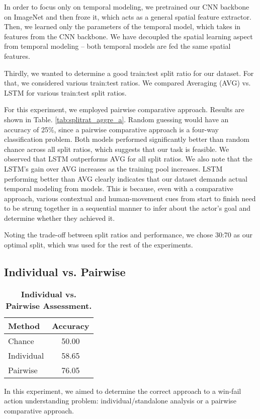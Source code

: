 \documentclass[final]{cvpr}
\begin{document}
In order to focus only on temporal modeling, we pretrained our CNN backbone on ImageNet and then froze it, which acts as a general spatial feature extractor. Then, we learned only the parameters of the temporal model, which takes in features from the CNN backbone. We have decoupled the spatial learning aspect from temporal modeling -- both temporal models are fed the same spatial features. 

Thirdly, we wanted to determine a good train:test split ratio for our dataset. For that, we considered various train:test ratios. We compared Averaging (AVG) vs. LSTM for various train:test split ratios.

For this experiment, we employed pairwise comparative approach. Results are shown in Table. \ref{tab:splitrat_aggre_a}. Random guessing would have an accuracy of 25\%, since a pairwise comparative approach is a four-way classification problem. Both models performed significantly better than random chance across all split ratios, which suggests that our task is feasible. We observed that LSTM outperforms AVG for all split ratios. We also note that the LSTM's gain over AVG increases as the training pool increases. LSTM performing better than AVG clearly indicates that our dataset demands actual temporal modeling from models. This is because, even with a comparative approach, various contextual and human-movement cues from start to finish need to be strung together in a sequential manner to infer about the actor's goal and determine whether they achieved it.

Noting the trade-off between split ratios and performance, we chose 30:70 as our optimal split, which was used for the rest of the experiments.
\subsection{Individual vs. Pairwise}
\label{sec:exp_indi_pair}
\begin{table}[]
\centering
\begin{tabular}{@{}lc@{}}
\toprule
\textbf{Method} & \textbf{Accuracy} \\ \midrule
Chance          & 50.00             \\ Individual       & 58.65             \\
Pairwise        & 76.05             \\ \bottomrule
\end{tabular}
\vspace{0.2cm}
\caption{\textbf{Individual vs. Pairwise Assessment.}}
\label{tab:indi_pair}
\end{table} In this experiment, we aimed to determine the correct approach to a win-fail action understanding problem: individual/standalone analysis or a pairwise comparative approach.
\end{document}
